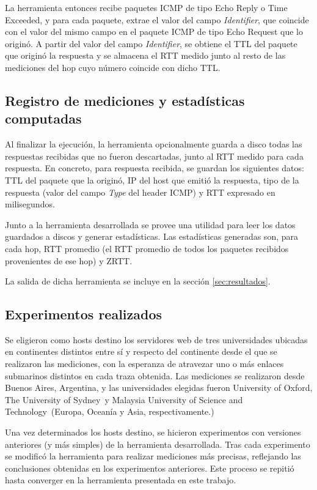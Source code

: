 \documentclass[a4paper, 10pt, twoside]{article}
\newcommand{\oxford}{University of Oxford}
\newcommand{\sydney}{The University of Sydney}
\newcommand{\must}{Malaysia University of Science and Technology}
\begin{document}
La herramienta entonces recibe paquetes ICMP de tipo Echo Reply o Time Exceeded, y para cada paquete, extrae el valor del campo \emph{Identifier}, que coincide con el valor del mismo campo en el paquete ICMP de tipo Echo Request que lo originó. A partir del valor del campo \emph{Identifier}, se obtiene el TTL del paquete que originó la respuesta y se almacena el RTT medido junto al resto de las mediciones del hop cuyo número coincide con dicho TTL.


\subsection{Registro de mediciones y estadísticas computadas}

Al finalizar la ejecución, la herramienta opcionalmente guarda a disco todas las respuestas recibidas que no fueron descartadas, junto al RTT medido para cada respuesta. En concreto, para respuesta recibida, se guardan los siguientes datos: TTL del paquete que la originó, IP del host que emitió la respuesta, tipo de la respuesta (valor del campo \emph{Type} del header ICMP) y RTT expresado en milisegundos.

Junto a la herramienta desarrollada se provee una utilidad para leer los datos guardados a discos y generar estadísticas. Las estadísticas generadas son, para cada hop, RTT promedio (el RTT promedio de todos los paquetes recibidos provenientes de ese hop) y ZRTT.

La salida de dicha herramienta se incluye en la sección \ref{sec:resultados}.


\subsection{Experimentos realizados}

Se eligieron como hosts destino los servidores web de tres universidades ubicadas en continentes distintos entre sí y respecto del continente desde el que se realizaron las mediciones, con la esperanza de atravezar uno o más enlaces submarinos distintos en cada traza obtenida. Las mediciones se realizaron desde Buenos Aires, Argentina, y las universidades elegidas fueron \oxford, \sydney\ y \must\ (Europa, Oceanía y Asia, respectivamente.)

Una vez determinados los hosts destino, se hicieron experimentos con versiones anteriores (y más simples) de la herramienta desarrollada. Tras cada experimento se modificó la herramienta para realizar mediciones más precisas, reflejando las conclusiones obtenidas en los experimentos anteriores. Este proceso se repitió hasta converger en la herramienta presentada en este trabajo.
\end{document}
